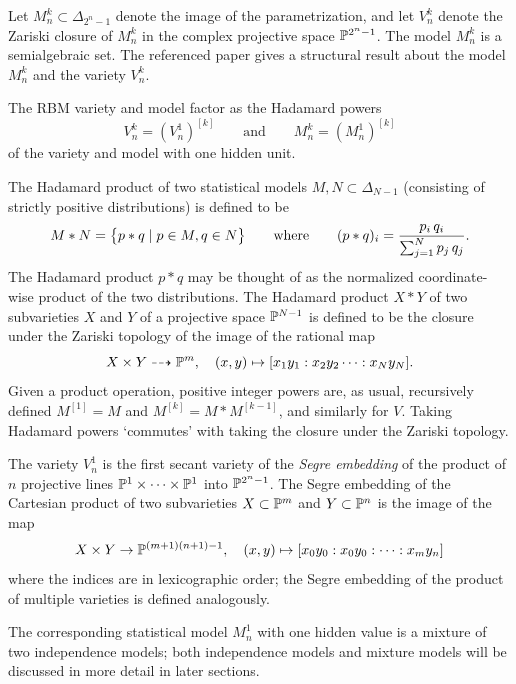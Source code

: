 \documentclass[cclicense]{hmcthesis}
\numberwithin{equation}{section}
\begin{document}
    Let $M_n^k \subset \Delta_{2^n-1}$ denote the image of the parametrization,
    and let $V_n^k$ denote the Zariski closure of $M_n^k$ in the complex
    projective space $\Proj^{2^n-1}$.  The model $M_n^k$ is a semialgebraic set.
    The referenced paper gives a structural result about the model $M_n^k$ and
    the variety $V_n^k$.
    \begin{theorem} \label{thm:factor}
    The RBM variety and model factor as the Hadamard powers
    \[
        V_n^k = (V_n^1)^{[k]}
        \qquad\text{and}\qquad
        M_n^k = (M_n^1)^{[k]}
    \]
    of the variety and model with one hidden unit.
    \end{theorem}
    \noindent The Hadamard product of two statistical models $M, N \subset
    \Delta_{N-1}$ (consisting of strictly positive distributions) is defined to
    be
    \[
        M * N = \cdel[\big]{p * q \mid p \in M, q \in N}
        \qquad
        \text{where}
        \qquad
        (p * q)_i = \frac{p_i\,q_i}{\sum_{j=1}^N p_j\,q_j}.
    \]
    The Hadamard product $p*q$ may be thought of as the normalized
    coordinate-wise product of the two distributions.  The Hadamard product $X *
    Y$ of two subvarieties $X$ and $Y$ of a projective space $\Proj^{N-1}$ is
    defined to be the closure under the Zariski topology of the image of the rational map
    \[
        X \times Y \dashrightarrow \Proj^m,
        \quad
        (x, y) \mapsto [x_1y_1 : x_2y_2\cdots : x_N y_N].
    \]
    Given a product operation, positive integer powers are, as usual,
    recursively defined $M^{[1]} = M$ and $M^{[k]} = M * M^{[k-1]}$, and
    similarly for $V$.  Taking Hadamard powers `commutes' with taking the
    closure under the Zariski topology.

    The variety $V_n^1$ is the first secant variety of the \emph{Segre
    embedding} of the product of $n$ projective lines $\Proj^1 \times \cdots
    \times \Proj^1$ into $\Proj^{2^n-1}$.  The Segre embedding of the Cartesian
    product of two subvarieties $X \subset \Proj^m$ and $Y \subset \Proj^n$ is
    the image of the map
    \[
        X \times Y \to \Proj^{(m+1)(n+1) - 1},
        \quad
        (x, y) \mapsto
        [x_0y_0: x_0 y_0 : \cdots : x_my_n]
    \]
    where the indices are in lexicographic order; the Segre embedding of the
    product of multiple varieties is defined analogously.
    
    The corresponding statistical model $M_n^1$ with one hidden value is a
    mixture of two independence models; both independence models and mixture
    models will be discussed in more detail in later sections.
\end{document}
